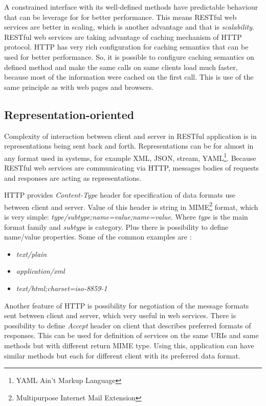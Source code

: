\documentclass[12pt,final,oneside]{fithesis2}
\begin{document}
A constrained interface with its well-defined methods have predictable behaviour that can be leverage for for better performance. This means RESTful web services are better in scaling, which is another advantage and that is \textit{scalability}. RESTful web services are taking advantage of caching mechanism of HTTP protocol. HTTP has very rich configuration for caching semantics that can be used for better performance. So, it is possible to configure caching semantics on defined method and make the same calls on same clients load much faster, because most of the information were cached on the first call. This is use of the same principle as with web pages and browsers. 

\subsection*{Representation-oriented}
Complexity of interaction between client and server in RESTful application is in representations being sent back and forth. Representations can be for almost in any format used in systems, for example XML, JSON, stream, YAML\footnote{YAML Ain't Markup Language}. Because RESTful web services are communicating via HTTP, messages bodies of requests and responses are acting as representations.

HTTP provides \textit{Content-Type} header for specification of data formats use between client and server. Value of this header is string in MIME\footnote{Multipurpose Internet Mail Extension} format, which is very simple: \textit{type/subtype;name=value;name=value}. Where \textit{type} is the main format family and \textit{subtype} is category. Plus there is possibility to define name/value properties. Some of the common examples are :

\begin{itemize}
\item
\textit{text/plain}

\item
\textit{application/xml}

\item
\textit{text/html;charset=iso-8859-1}
\end{itemize}

Another feature of HTTP is possibility for negotiation of the message formats sent between client and server, which very useful in web services. There is possibility to define \textit{Accept} header on client that describes preferred formats of responses. This can be used for definition of services on the same URIs and same methods but with different return MIME type. Using this, application can have similar methods but each for different client with its preferred data format.
\end{document}
